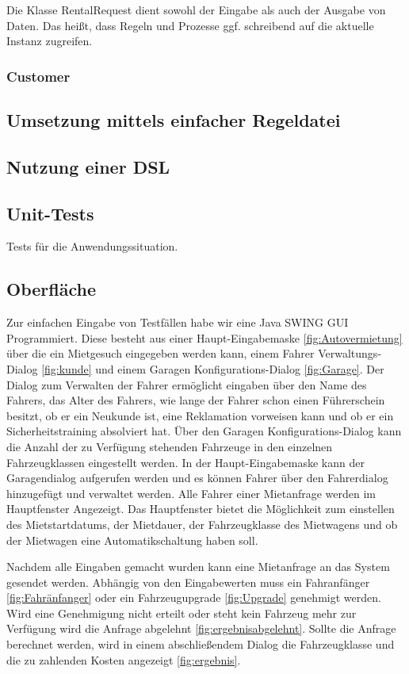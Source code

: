 Die Klasse RentalRequest dient sowohl der Eingabe als auch der Ausgabe von Daten.
Das heißt, dass Regeln und Prozesse ggf. schreibend auf die aktuelle Instanz zugreifen.


\subsubsection{Customer}


\subsection{Umsetzung mittels einfacher Regeldatei}

\subsection{Nutzung einer DSL}

\subsection{Unit-Tests}
Tests für die Anwendungssituation.

\subsection{Oberfläche}
Zur einfachen Eingabe von Testfällen habe wir eine Java SWING GUI Programmiert. Diese besteht aus einer Haupt-Eingabemaske \ref{fig:Autovermietung} über die ein Mietgesuch eingegeben werden kann, einem Fahrer Verwaltungs-Dialog \ref{fig:kunde} und einem Garagen Konfigurations-Dialog \ref{fig:Garage}. Der Dialog zum Verwalten der Fahrer ermöglicht eingaben über den Name des Fahrers, das Alter des Fahrers, wie lange der Fahrer schon einen Führerschein besitzt, ob er ein Neukunde ist, eine Reklamation vorweisen kann und ob er ein Sicherheitstraining absolviert hat. Über den Garagen Konfigurations-Dialog kann die Anzahl der zu Verfügung stehenden Fahrzeuge in den einzelnen Fahrzeugklassen eingestellt werden. In der Haupt-Eingabemaske kann der Garagendialog aufgerufen werden und es können Fahrer über den Fahrerdialog hinzugefügt und verwaltet werden. Alle Fahrer einer Mietanfrage werden im Hauptfenster Angezeigt. Das Hauptfenster bietet die Möglichkeit zum einstellen des Mietstartdatums, der Mietdauer, der Fahrzeugklasse des Mietwagens und ob der Mietwagen eine Automatikschaltung haben soll. 

Nachdem alle Eingaben gemacht wurden kann eine Mietanfrage an das System gesendet werden. Abhängig von den Eingabewerten muss ein Fahranfänger \ref{fig:Fahränfanger} oder ein Fahrzeugupgrade \ref{fig:Upgrade} genehmigt werden. Wird eine Genehmigung nicht erteilt oder steht kein Fahrzeug mehr zur Verfügung wird die Anfrage abgelehnt \ref{fig:ergebnisabgelehnt}. Sollte die Anfrage berechnet werden, wird in einem abschließendem Dialog die Fahrzeugklasse und die zu zahlenden Kosten angezeigt \ref{fig:ergebnis}.


